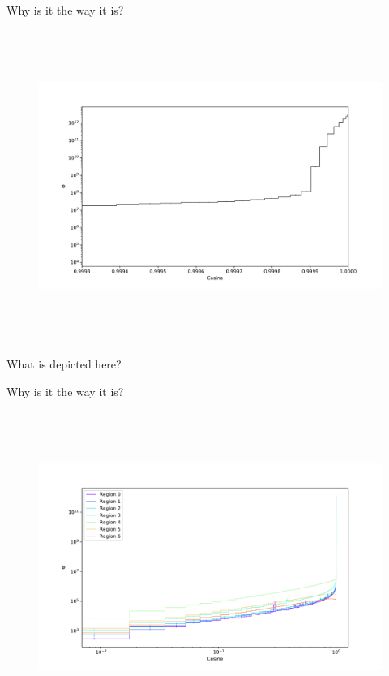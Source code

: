 Why is it the way it is?

\clearpage

%
\begin{figure}[htb]
\centering
\includegraphics[height=4in]{tex/figures/flux_cos_detail.png}
\caption[]{}
\label{fig:}
\end{figure}

What is depicted here?

Why is it the way it is?

\clearpage

%
\begin{figure}[htb]
\centering
\includegraphics[height=4in]{tex/figures/flux_rad_cos.png}
\caption[]{}
\label{fig:}
\end{figure}

